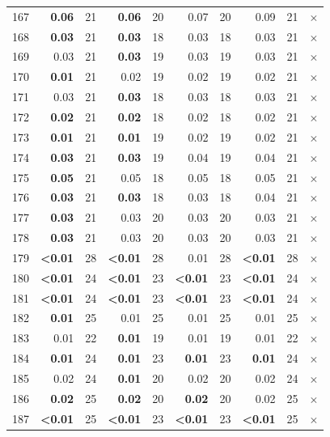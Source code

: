\begin{longtable}{lr@{\hskip 4pt}l@{\hskip 12pt}r@{\hskip 4pt}l@{\hskip 12pt}r@{\hskip 4pt}l@{\hskip 12pt}r@{\hskip 4pt}l@{\hskip 12pt}r}
167 & \textbf{0.06} & 21 & \textbf{0.06} & 20 & 0.07 & 20 & 0.09 & 21 & $\times$ \\
168 & \textbf{0.03} & 21 & \textbf{0.03} & 18 & 0.03 & 18 & 0.03 & 21 & $\times$ \\
169 & 0.03 & 21 & \textbf{0.03} & 19 & 0.03 & 19 & 0.03 & 21 & $\times$ \\
170 & \textbf{0.01} & 21 & 0.02 & 19 & 0.02 & 19 & 0.02 & 21 & $\times$ \\
171 & 0.03 & 21 & \textbf{0.03} & 18 & 0.03 & 18 & 0.03 & 21 & $\times$ \\
172 & \textbf{0.02} & 21 & \textbf{0.02} & 18 & 0.02 & 18 & 0.02 & 21 & $\times$ \\
173 & \textbf{0.01} & 21 & \textbf{0.01} & 19 & 0.02 & 19 & 0.02 & 21 & $\times$ \\
174 & \textbf{0.03} & 21 & \textbf{0.03} & 19 & 0.04 & 19 & 0.04 & 21 & $\times$ \\
175 & \textbf{0.05} & 21 & 0.05 & 18 & 0.05 & 18 & 0.05 & 21 & $\times$ \\
176 & \textbf{0.03} & 21 & \textbf{0.03} & 18 & 0.03 & 18 & 0.04 & 21 & $\times$ \\
177 & \textbf{0.03} & 21 & 0.03 & 20 & 0.03 & 20 & 0.03 & 21 & $\times$ \\
178 & \textbf{0.03} & 21 & 0.03 & 20 & 0.03 & 20 & 0.03 & 21 & $\times$ \\
179 & \textbf{<0.01} & 28 & \textbf{<0.01} & 28 & 0.01 & 28 & \textbf{<0.01} & 28 & $\times$ \\
180 & \textbf{<0.01} & 24 & \textbf{<0.01} & 23 & \textbf{<0.01} & 23 & \textbf{<0.01} & 24 & $\times$ \\
181 & \textbf{<0.01} & 24 & \textbf{<0.01} & 23 & \textbf{<0.01} & 23 & \textbf{<0.01} & 24 & $\times$ \\
182 & \textbf{0.01} & 25 & 0.01 & 25 & 0.01 & 25 & 0.01 & 25 & $\times$ \\
183 & 0.01 & 22 & \textbf{0.01} & 19 & 0.01 & 19 & 0.01 & 22 & $\times$ \\
184 & \textbf{0.01} & 24 & \textbf{0.01} & 23 & \textbf{0.01} & 23 & \textbf{0.01} & 24 & $\times$ \\
185 & 0.02 & 24 & \textbf{0.01} & 20 & 0.02 & 20 & 0.02 & 24 & $\times$ \\
186 & \textbf{0.02} & 25 & \textbf{0.02} & 20 & \textbf{0.02} & 20 & 0.02 & 25 & $\times$ \\
187 & \textbf{<0.01} & 25 & \textbf{<0.01} & 23 & \textbf{<0.01} & 23 & \textbf{<0.01} & 25 & $\times$ \\

\end{longtable}

